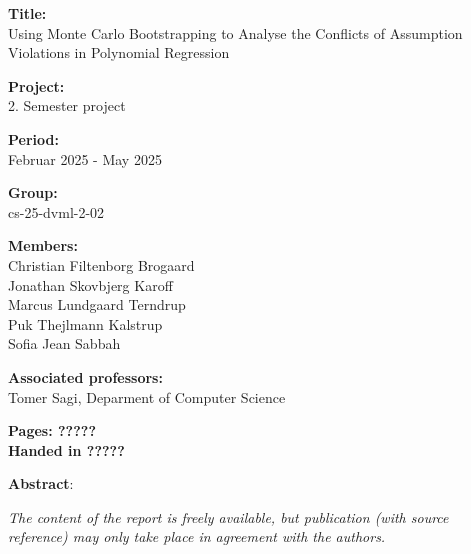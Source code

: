 \begin{minipage}[t]{0.48\textwidth}
\textbf{Title:} \\[5pt]\hspace*{2ex}
\noindent Using Monte Carlo Bootstrapping to Analyse the Conflicts of Assumption Violations in Polynomial Regression

\vspace*{2ex}

\textbf{Project:} \\[5pt]\bigskip\hspace{2ex}
2. Semester project

\textbf{Period:} \\[5pt]\bigskip\hspace{2ex}
Februar 2025 -  May 2025

\textbf{Group:} \\[5pt]\bigskip\hspace{2ex}
cs-25-dvml-2-02

\textbf{Members:} \\[5pt]\hspace*{2ex}
Christian Filtenborg Brogaard \\\hspace*{2ex}
Jonathan Skovbjerg Karoff \\\hspace*{2ex}
Marcus Lundgaard Terndrup \\\hspace*{2ex}
Puk Thejlmann Kalstrup \\\hspace*{2ex}
Sofia Jean Sabbah \\\hspace*{2ex}


\textbf{Associated professors:} \\[5pt]\hspace*{2ex}
Tomer Sagi, Deparment of Computer Science
\\\hspace*{2ex}

\vspace*{1cm}

\textbf{Pages: ?????} \\
\textbf{Handed in ?????}

\end{minipage}
\hfill
\begin{minipage}[t]{0.5\textwidth}
\textbf{Abstract}: \\[5pt]
\fbox{\parbox{8cm}{}}
\end{minipage}

\vfill

{\footnotesize\itshape \noindent The content of the report is freely available, but publication (with source reference) may only take place in agreement with the authors.}

